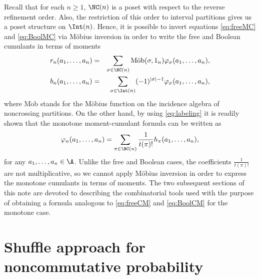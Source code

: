 Recall that for each $n\geq1$, $\NC(n)$ is a poset with respect to the reverse refinement order. Also, the restriction of this order to interval partitions gives us a poset structure on $\Int(n)$. Hence, it is possible to invert equations \eqref{eq:freeMC} and \eqref{eq:BoolMC} via M\"obius inversion in order to write the free and Boolean cumulants in terms of moments
\begin{eqnarray}
	\label{eq:freeCM}
	r_n(a_1,\dots,a_n)
	&=& \sum_{\sigma \in \NC(n)} \operatorname{M\ddot{o}b}(\sigma,1_n)\varphi_\sigma(a_1,\dots,a_n),
	\\ \label{eq:BoolCM}
	b_n(a_1,\dots,a_n)
	&=& \sum_{\sigma \in \Int(n)}(-1)^{|\sigma|-1}\varphi_\sigma(a_1,\dots,a_n),
\end{eqnarray}
where $\mathrm{M\ddot{o}b}$ stands for the M\"obius function on the incidence algebra of noncrossing partitions.
On the other hand, by using \eqref{eq:labeling} it is readily shown that the monotone moment-cumulant formula can be written as
\begin{equation}
\label{eq:monMC2}
	\varphi_n(a_1,\dots,a_n) = \sum_{\pi\in \NC(n)} \frac{1}{t(\pi)!} h_\pi(a_1,\dots,a_n),
\end{equation}
for any $a_1,\dots,a_n\in \A$. Unlike the free and Boolean cases, the coefficients $\frac{1}{t(\pi)!}$ are not multiplicative, so we cannot apply M\"obius inversion in order to express the monotone cumulants in terms of moments. The two subsequent sections of this note are devoted to describing the combinatorial tools used with the purpose of obtaining a formula analogous to \eqref{eq:freeCM} and \eqref{eq:BoolCM} for the monotone case.

\fi

\section{Shuffle approach for noncommutative probability}
\label{sec:shuffle}

